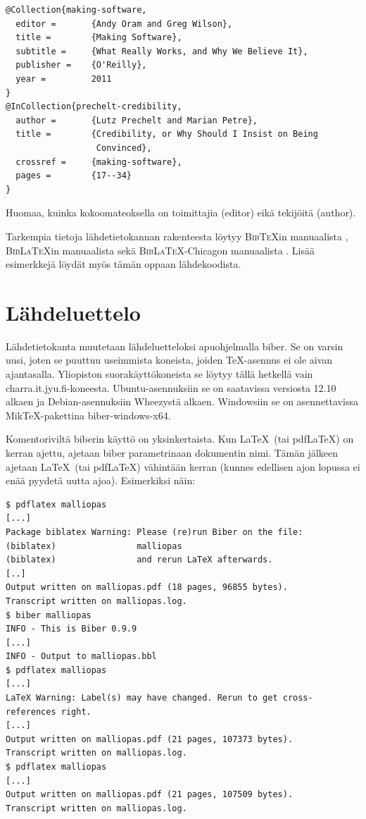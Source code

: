 \documentclass[utf8]{gradu3}
\begin{document}
\begingroup\footnotesize
\begin{verbatim}
@Collection{making-software,
  editor =       {Andy Oram and Greg Wilson},
  title =        {Making Software},
  subtitle =     {What Really Works, and Why We Believe It},
  publisher =    {O'Reilly},
  year =         2011
}
@InCollection{prechelt-credibility,
  author =       {Lutz Prechelt and Marian Petre},
  title =        {Credibility, or Why Should I Insist on Being
                  Convinced},
  crossref =     {making-software},
  pages =        {17--34}
}
\end{verbatim}
\endgroup

Huomaa, kuinka kokoomateoksella on toimittajia (editor) eikä tekijöitä
(author).

Tarkempia tietoja lähdetietokannan rakenteesta löytyy
\textsc{Bib\TeX}in manuaalista \parencite{bibtexing},
\textsc{Bib\LaTeX}in manuaalista \parencite[luku~2]{biblatex-manual}
sekä \textsc{Bib\LaTeX}-Chicagon manuaalista
\parencite[luvut 5.1--5.2]{biblatex-chicago-manual}.  Lisää
esimerkkejä löydät myös tämän oppaan lähdekoodista.

\section{Lähdeluettelo}

Lähdetietokanta muutetaan lähdeluetteloksi apuohjelmalla {biber}.  Se
on varsin uusi, joten se puuttuu useimmista koneista, joiden
\TeX-asennus ei ole aivan ajantasalla.  Yliopiston suorakäyttökoneista
se löytyy tällä hetkellä vain charra.it.jyu.fi-koneesta.
Ubuntu-asennuksiin se on saatavissa versiosta 12.10 alkaen ja
Debian-asennuksiin Wheezystä alkaen.  Windowsiin se on asennettavissa
Mik\TeX-pakettina biber-windows-x64.

Komentoriviltä biberin käyttö on yksinkertaista.  Kun \LaTeX\ (tai
pdf\LaTeX) on kerran ajettu, ajetaan biber parametrinaan dokumentin
nimi.  Tämän jälkeen ajetaan \LaTeX\ (tai pdf\LaTeX) vähintään kerran
(kunnes edellisen ajon lopussa ei enää pyydetä uutta ajoa).
Esimerkiksi näin:

\begingroup\footnotesize
\begin{verbatim}
$ pdflatex malliopas
[...]
Package biblatex Warning: Please (re)run Biber on the file:
(biblatex)                malliopas
(biblatex)                and rerun LaTeX afterwards.
[..]
Output written on malliopas.pdf (18 pages, 96855 bytes).
Transcript written on malliopas.log.
$ biber malliopas
INFO - This is Biber 0.9.9
[...]
INFO - Output to malliopas.bbl
$ pdflatex malliopas
[...]
LaTeX Warning: Label(s) may have changed. Rerun to get cross-references right.
[...]
Output written on malliopas.pdf (21 pages, 107373 bytes).
Transcript written on malliopas.log.
$ pdflatex malliopas
[...]
Output written on malliopas.pdf (21 pages, 107509 bytes).
Transcript written on malliopas.log.
\end{verbatim}
\endgroup
\end{document}
